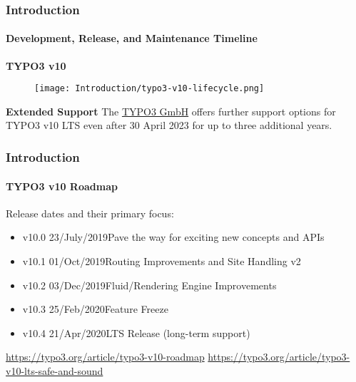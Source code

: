 
\begin{frame}[fragile]
	\frametitle{Introduction}
	\framesubtitle{Development, Release, and Maintenance Timeline}

	\textbf{TYPO3 v10}

	\begin{figure}
		\texttt{[image: Introduction/typo3-v10-lifecycle.png]}
	\end{figure}

	\textbf{Extended Support}\newline
	\smaller
		The \href{https://typo3.com}{TYPO3 GmbH} offers further support options
		for TYPO3 v10 LTS even after 30 April 2023 for up to three additional
		years.
	\normalsize

\end{frame}


\begin{frame}[fragile]
	\frametitle{Introduction}
	\framesubtitle{TYPO3 v10 Roadmap}

	Release dates and their primary focus:

	\begin{itemize}

		\item v10.0 \tabto{1.1cm}23/July/2019\tabto{3.4cm}Pave the way for exciting new concepts and APIs
		\item v10.1 \tabto{1.1cm}01/Oct/2019\tabto{3.4cm}Routing Improvements and Site Handling v2
		\item v10.2 \tabto{1.1cm}03/Dec/2019\tabto{3.4cm}Fluid/Rendering Engine Improvements
		\item v10.3 \tabto{1.1cm}25/Feb/2020\tabto{3.4cm}Feature Freeze
		\item
			\begingroup
				\color{typo3orange}
				v10.4 \tabto{1.1cm}21/Apr/2020\tabto{3.4cm}LTS Release (long-term support)
			\endgroup

	\end{itemize}

	\vspace{0.6cm}
	\smaller
		\url{https://typo3.org/article/typo3-v10-roadmap}\newline
		\url{https://typo3.org/article/typo3-v10-lts-safe-and-sound}
	\normalsize

\end{frame}

